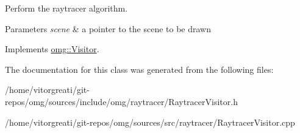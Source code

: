 Perform the raytracer algorithm.


\begin{DoxyParams}{Parameters}
{\em scene} & a pointer to the scene to be drawn \\
\hline
\end{DoxyParams}


Implements \mbox{\hyperlink{classomg_1_1_visitor_af697e96f0f5da7c9b882ae316c81e80c}{omg\+::\+Visitor}}.



The documentation for this class was generated from the following files\+:\begin{DoxyCompactItemize}
\item 
/home/vitorgreati/git-\/repos/omg/sources/include/omg/raytracer/Raytracer\+Visitor.\+h\item 
/home/vitorgreati/git-\/repos/omg/sources/src/raytracer/Raytracer\+Visitor.\+cpp\end{DoxyCompactItemize}
